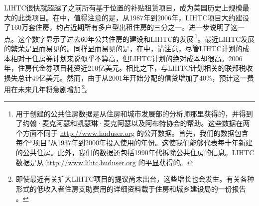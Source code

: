 \documentclass[lang=cn,11pt,a4paper]{paper}
\begin{document}
LIHTC很快就超越了之前所有基于位置的补贴租赁项目，成为美国历史上规模最大的此类项目。在中，值得注意的是，从1987年到2006年，LIHTC项目大约建设了160万套住房，约占近期所有多户型出租住房的三分之一。进一步说明了这一点。这个数字显示了过去60年公共住房的建设和LIHTC的发展\,\footnote{用于创建的公共住房数据是从住房和城市发展部的分析师那里获得的，并得到了约翰·麦克阿瑟和凯瑟琳·麦克阿瑟以及阿布特协会的帮助。这些数据在两个方面不同于 \url{http://www.huduser.org} 的公开数据。首先，我们的数据包含每个“项目”从1937年到2000年投入使用的年份。这使我们能够代表每十年新建的公共住房。此外，我们的数据还包括1990年代拆除公共住房的信息。LIHTC数据是从 \url{http://www.lihtc.huduser.org} 的平显获得的。}。最近LIHTC发展的繁荣是显而易见的。同样显而易见的是，在中，请注意，尽管LIHTC计划的成本相对于住房券计划来说似乎不算高，但LIHTC计划的绝对成本却很高。2006年，住房代金券项目耗资近210亿美元。相比之下，与LIHTC计划相关的联邦税收损失总计49亿美元。然而，由于从2001年开始分配的信贷增加了40\%，预计这一费用在未来几年将急剧增加\,\footnote{即使最近有关扩大LIHTC项目的提议尚未出台，这些增长也会发生。有关各种形式的低收入者住房支助费用的详细资料载于住房和城乡建设局的一份报告 \cite{USCongress2005}。}。
\end{document}
